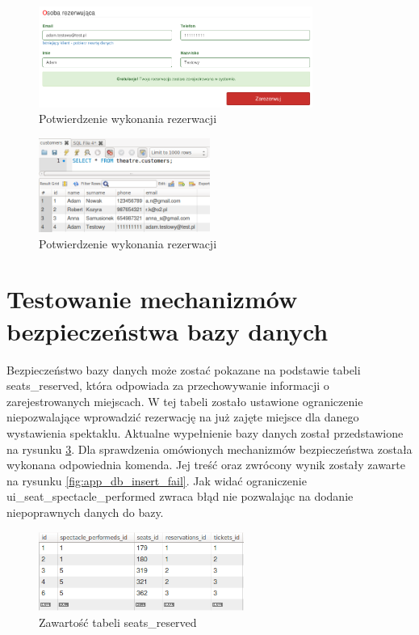 \documentclass{mgr}
\begin{document}
\begin{figure}[!ht]
	\centering
	\includegraphics[width=0.8\textwidth]{images/app_reservation_success.png}
	\caption{Potwierdzenie wykonania rezerwacji}
	\label{fig:app-reservation-success}
\end{figure}

\begin{figure}[!ht]
	\centering
	\includegraphics[width=0.5\textwidth]{images/app_db_show_clients.png}
	\caption{Potwierdzenie wykonania rezerwacji}
	\label{fig:app-db-show-clients}
\end{figure}


\section{Testowanie mechanizmów bezpieczeństwa bazy danych}
Bezpieczeństwo bazy danych może zostać pokazane na podstawie tabeli seats\_reserved, która odpowiada za przechowywanie informacji o zarejestrowanych miejscach. W tej tabeli zostało ustawione ograniczenie niepozwalające wprowadzić rezerwację na już zajęte miejsce dla danego wystawienia spektaklu. Aktualne wypełnienie bazy danych został przedstawione na rysunku \ref{fig:app_db_seats_reserved}. Dla sprawdzenia omówionych mechanizmów bezpieczeństwa została wykonana odpowiednia komenda. Jej treść oraz zwrócony wynik zostały zawarte na rysunku \ref{fig:app_db_insert_fail}. Jak widać ograniczenie ui\_seat\_spectacle\_performed zwraca błąd nie pozwalając na dodanie niepoprawnych danych do bazy.

\begin{figure}[!ht]
	\centering
	\includegraphics[width=0.6\textwidth]{images/app_db_seats_reserved.png}
	\caption{Zawartość tabeli seats\_reserved}
	\label{fig:app_db_seats_reserved}
\end{figure}
\end{document}
